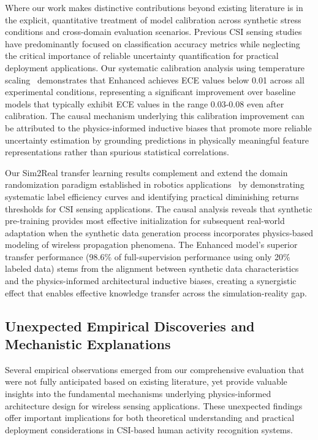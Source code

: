 \documentclass[journal]{IEEEtran}
\begin{document}
Where our work makes distinctive contributions beyond existing literature is in the explicit, quantitative treatment of model calibration across synthetic stress conditions and cross-domain evaluation scenarios. Previous CSI sensing studies have predominantly focused on classification accuracy metrics while neglecting the critical importance of reliable uncertainty quantification for practical deployment applications. Our systematic calibration analysis using temperature scaling~\cite{calibration_guo2017} demonstrates that Enhanced achieves ECE values below 0.01 across all experimental conditions, representing a significant improvement over baseline models that typically exhibit ECE values in the range 0.03-0.08 even after calibration. The causal mechanism underlying this calibration improvement can be attributed to the physics-informed inductive biases that promote more reliable uncertainty estimation by grounding predictions in physically meaningful feature representations rather than spurious statistical correlations.

Our Sim2Real transfer learning results complement and extend the domain randomization paradigm established in robotics applications~\cite{peng2018sim2real} by demonstrating systematic label efficiency curves and identifying practical diminishing returns thresholds for CSI sensing applications. The causal analysis reveals that synthetic pre-training provides most effective initialization for subsequent real-world adaptation when the synthetic data generation process incorporates physics-based modeling of wireless propagation phenomena. The Enhanced model's superior transfer performance (98.6\% of full-supervision performance using only 20\% labeled data) stems from the alignment between synthetic data characteristics and the physics-informed architectural inductive biases, creating a synergistic effect that enables effective knowledge transfer across the simulation-reality gap.

\subsection{Unexpected Empirical Discoveries and Mechanistic Explanations}

Several empirical observations emerged from our comprehensive evaluation that were not fully anticipated based on existing literature, yet provide valuable insights into the fundamental mechanisms underlying physics-informed architecture design for wireless sensing applications. These unexpected findings offer important implications for both theoretical understanding and practical deployment considerations in CSI-based human activity recognition systems.
\end{document}
